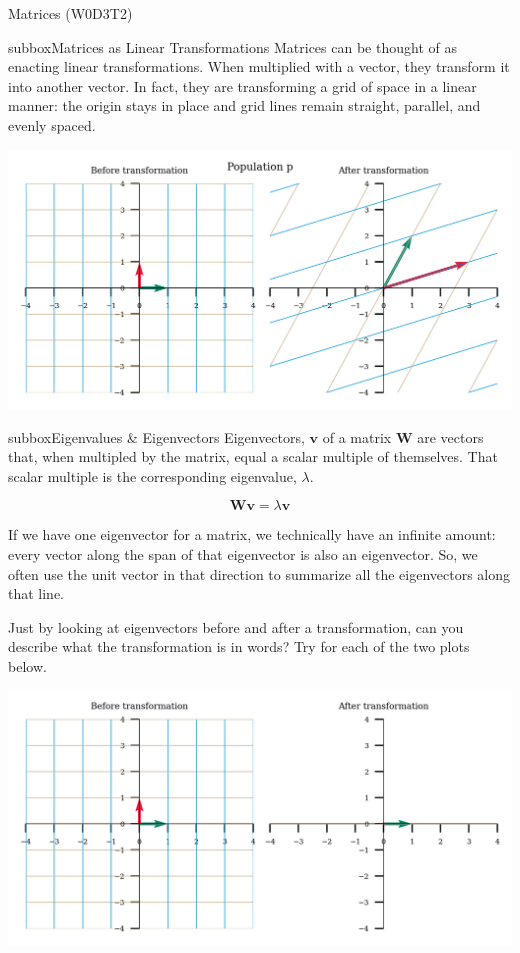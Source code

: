 \begin{textbox}{Matrices (W0D3T2)}

\begin{subbox}{subbox}{Matrices as Linear Transformations}
\scriptsize
Matrices can be thought of as enacting linear transformations. When multiplied with a vector, they transform it into another vector. In fact, they are transforming a grid of space in a linear manner: the origin stays in place and grid lines remain straight, parallel, and evenly spaced.

\centering
\includegraphics[scale=0.5]{Figures/PreCourse/Figure4.png}
\end{subbox}


\begin{subbox}{subbox}{Eigenvalues \& Eigenvectors}
\tiny
Eigenvectors, $\mathbf{v}$ of a matrix $\mathbf{W}$ are vectors that, when multipled by the matrix, equal a scalar multiple of themselves. That scalar multiple is the corresponding eigenvalue, $\lambda$.

\begin{equation}
\mathbf{W}\mathbf{v} = \lambda\mathbf{v}
\end{equation}

If we have one eigenvector for a matrix, we technically have an infinite amount: every vector along the span of that eigenvector is also an eigenvector. So, we often use the unit vector in that direction to summarize all the eigenvectors along that line. 

Just by looking at eigenvectors before and after a transformation, can you describe what the transformation is in words? Try for each of the two plots below.

\centering
\includegraphics[scale=0.1]{Figures/PreCourse/Figure5.png}


\end{subbox}
\end{textbox}
